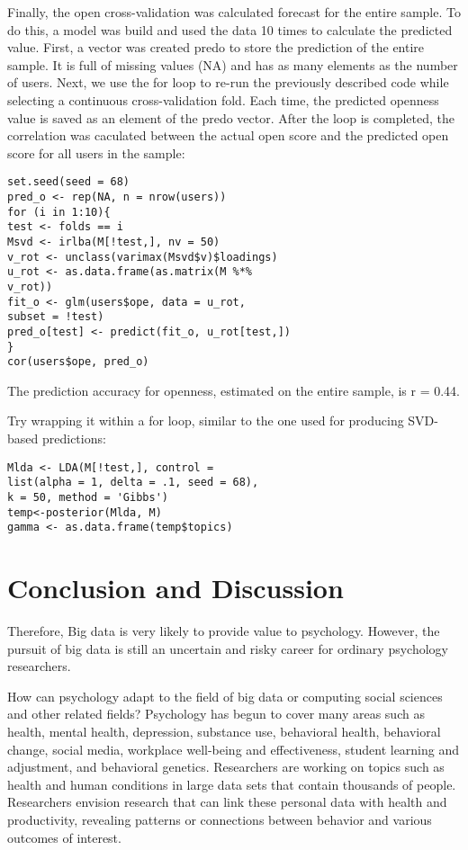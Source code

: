 Finally, the open cross-validation was calculated forecast for the 
entire sample. To do this,  a model was build and used the data 10 
times to calculate the predicted value. First, a vector was created
predo to store the prediction of the entire sample. It is full of 
missing values (NA) and has as many elements as the number of 
users. Next, we use the for loop to re-run the previously described
 code while selecting a continuous cross-validation fold. Each 
time, the predicted openness value is saved as an element of the 
predo vector. After the loop is completed, the correlation was 
caculated between the actual open score and the predicted open 
score for all users in the sample:

\begin{verbatim}
set.seed(seed = 68)
pred_o <- rep(NA, n = nrow(users))
for (i in 1:10){
test <- folds == i
Msvd <- irlba(M[!test,], nv = 50)
v_rot <- unclass(varimax(Msvd$v)$loadings)
u_rot <- as.data.frame(as.matrix(M %*%
v_rot))
fit_o <- glm(users$ope, data = u_rot,
subset = !test)
pred_o[test] <- predict(fit_o, u_rot[test,])
}
cor(users$ope, pred_o)
\end{verbatim}

The prediction accuracy for openness, estimated on the entire
sample, is r = 0.44.

Try wrapping it within a for loop, similar to the one used for 
producing SVD-based predictions:

\begin{verbatim}
Mlda <- LDA(M[!test,], control =
list(alpha = 1, delta = .1, seed = 68),
k = 50, method = 'Gibbs')
temp<-posterior(Mlda, M)
gamma <- as.data.frame(temp$topics)
\end{verbatim}

\section{Conclusion and Discussion}

Therefore, Big data is very likely to provide value to psychology.
 However, the pursuit of big data is still an uncertain and risky 
career for ordinary psychology researchers.

How can psychology adapt to the field of big data or computing 
social sciences and other related fields? Psychology has begun to 
cover many areas such as health, mental health, depression, 
substance use, behavioral health, behavioral change, social media,
 workplace well-being and effectiveness, student learning and 
adjustment, and behavioral genetics. Researchers are working on 
topics such as health and human conditions in large data sets that
 contain thousands of people. Researchers envision research that 
can link these personal data with health and productivity, 
revealing patterns or connections between behavior and various 
outcomes of interest.

